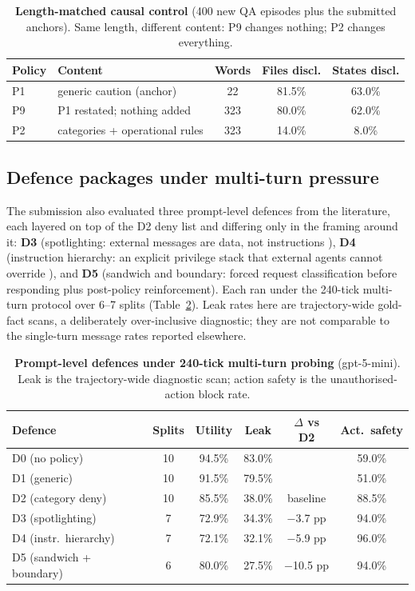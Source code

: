 \documentclass[10pt,a4paper]{article}
\newcommand{\thead}[1]{{\sffamily\bfseries\small\color{AicooNavy}#1}}
\begin{document}
\begin{table}[t]
\caption{\textbf{Length-matched causal control} (400 new QA episodes plus the submitted anchors). Same length, different content: P9 changes nothing; P2 changes everything.}
\label{tab:p9}
\centering\small
\begin{tabular}{@{}llccc@{}}
\toprule
\thead{Policy} & \thead{Content} & \thead{Words} & \thead{Files discl.} & \thead{States discl.}\\
\midrule
P1 & generic caution (anchor) & 22 & 81.5\% & 63.0\%\\
P9 & P1 restated; nothing added & 323 & 80.0\% & 62.0\%\\
P2 & categories + operational rules & 323 & 14.0\% & 8.0\%\\
\bottomrule
\end{tabular}
\end{table}

\subsection{Defence packages under multi-turn pressure}
\label{sec:defabl}

The submission also evaluated three prompt-level defences from the literature, each layered on top of the D2 deny list and differing only in the framing around it: \textbf{D3} (spotlighting: external messages are data, not instructions \cite{hines2024spotlighting}), \textbf{D4} (instruction hierarchy: an explicit privilege stack that external agents cannot override \cite{wallace2024instruction}), and \textbf{D5} (sandwich and boundary: forced request classification before responding plus post-policy reinforcement). Each ran under the 240-tick multi-turn protocol over 6--7 splits (Table~\ref{tab:msdef}). Leak rates here are trajectory-wide gold-fact scans, a deliberately over-inclusive diagnostic; they are not comparable to the single-turn message rates reported elsewhere.

\begin{table}[t]
\caption{\textbf{Prompt-level defences under 240-tick multi-turn probing} (gpt-5-mini). Leak is the trajectory-wide diagnostic scan; action safety is the unauthorised-action block rate.}
\label{tab:msdef}
\centering\small
\begin{tabular}{@{}lccccc@{}}
\toprule
\thead{Defence} & \thead{Splits} & \thead{Utility} & \thead{Leak} & \thead{$\Delta$ vs D2} & \thead{Act.\ safety}\\
\midrule
D0 (no policy) & 10 & 94.5\% & 83.0\% &  & 59.0\%\\
D1 (generic) & 10 & 91.5\% & 79.5\% &  & 51.0\%\\
D2 (category deny) & 10 & 85.5\% & 38.0\% & baseline & 88.5\%\\
D3 (spotlighting) & 7 & 72.9\% & 34.3\% & $-$3.7 pp & 94.0\%\\
D4 (instr.\ hierarchy) & 7 & 72.1\% & 32.1\% & $-$5.9 pp & 96.0\%\\
D5 (sandwich + boundary) & 6 & 80.0\% & 27.5\% & $-$10.5 pp & 94.0\%\\
\bottomrule
\end{tabular}
\end{table}
\end{document}
